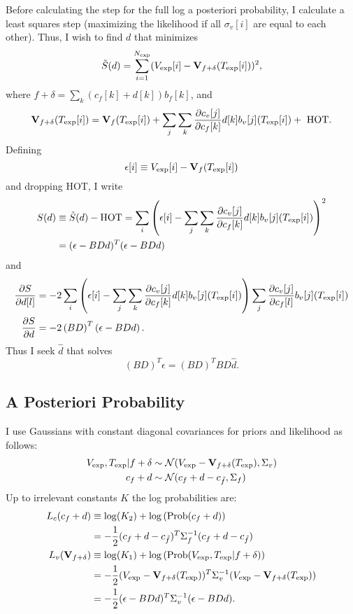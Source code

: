 \documentclass[11pt]{article}
\newcommand{\normal}[2]{{\cal N}(#1,#2)}
\newcommand{\normalexp}[3]{ -\frac{1}{2}
      (#1 - #2)^T #3^{-1} (#1 - #2) }
\newcommand{\fnom}{\tilde f}
\newcommand{\Prob}{\text{Prob}}
\newcommand{\partiald}[2]{\frac{\partial #1}{\partial #2}}
\newcommand\Vt{\mathbf{V}}
\newcommand\vexp{V_{\rm{exp}}}
\newcommand\texp{T_{\rm{exp}}}
\newcommand\cf{c_f}
\newcommand\cv{c_v}
\newcommand\fbasis{b_f}
\newcommand\vbasis{b_v}
\begin{document}
Before calculating the step for the full log a posteriori probability,
I calculate a least squares step (maximizing the likelihood if all
$\sigma_v[i]$ are equal to each other).  Thus, I wish to find $d$ that
minimizes
\begin{equation}
  \label{eq:ssq}
  \tilde S(d) = \sum_{i=1}^{N_{\rm exp}} (\vexp[i] - \Vt_{f+\delta}(\texp[i]))^2,
\end{equation}
where $f+\delta = \sum_k (\cf[k] + d[k])\fbasis[k]$, and 
\begin{equation}
  \label{eq:taylor}
  \Vt_{f+\delta}(\texp[i]) = \Vt_f(\texp[i]) +
  \sum_j \sum_k \partiald{\cv[j]}{\cf[k]}d[k]\vbasis[j](\texp[i])
  +\text{ HOT}.
\end{equation}
Defining
\begin{equation}
  \label{eq:epsilon}
  \epsilon[i] \equiv \vexp[i] - \Vt_f(\texp[i])
\end{equation}
and dropping HOT, I write
\begin{align}
  S(d) &\equiv \tilde S(d) - \text{HOT} = \sum_i \left( \epsilon[i] -
  \sum_j \sum_k \partiald{\cv[j]}{\cf[k]}d[k]\vbasis[j](\texp[i])
  \right)^2 \nonumber \\
  \label{eq:sd}
  &= (\epsilon - BDd)^T(\epsilon - BDd)
\end{align}
and
\begin{align*}
  \partiald{S}{d[l]} &= -2 \sum_i \left( \epsilon[i] -
  \sum_j \sum_k \partiald{\cv[j]}{\cf[k]}d[k]\vbasis[j](\texp[i])
  \right)
  \sum_j \partiald{\cv[j]}{\cf[l]}\vbasis[j](\texp[i])\\
  \partiald{S}{d} &= -2\left(BD\right)^T\left(\epsilon - BDd\right).
\end{align*}
Thus I seek $\hat d$ that solves
\begin{equation}
  \label{eq:dhat}
  \left(BD\right)^T\epsilon = \left(BD\right)^T BD \hat d.
\end{equation}

\subsection{A Posteriori Probability}
\label{sec:app}

I use Gaussians with constant diagonal covariances for priors and
likelihood as follows:
\begin{align}
\vexp,\texp | f+\delta &\sim
\normal{\vexp-\Vt_{f+\delta}(\texp)}{\Sigma_v} \\
\cf+d &\sim \normal{\cf+d - c_{\fnom}}{\Sigma_f}
\end{align}
Up to irrelevant constants $K$ the log probabilities are:
\begin{align}
  L_c(\cf+d) & \equiv \log(K_2) + \log \left(\Prob(\cf+d) \right)\\
  & = \normalexp{\cf+d}{c_{\fnom}}{\Sigma_f}\\
  L_v(\Vt_{f+\delta}) & \equiv \log(K_1) + \log
  \left(\Prob(\vexp,\texp | f+\delta) \right)
  \nonumber \\
  & = \normalexp{\vexp}{\Vt_{f+\delta}(\texp)}{\Sigma_v} \\
  &= \normalexp{\epsilon}{BDd}{\Sigma_v}.
\end{align}
\end{document}
